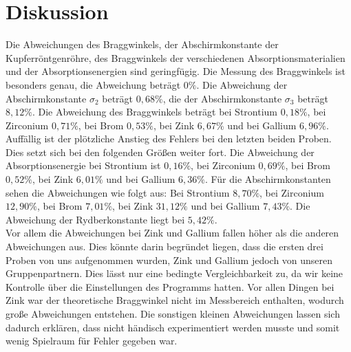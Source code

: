 \section{Diskussion}
\label{sec:Diskussion}
Die Abweichungen des Braggwinkels, der Abschirmkonstante der Kupferröntgenröhre, des Braggwinkels der verschiedenen Absorptionsmaterialien und der 
Absorptionsenergien sind geringfügig. Die Messung des Braggwinkels ist besonders genau, die Abweichung beträgt $0 \%$. Die Abweichung der Abschirmkonstante $\sigma_2$ 
beträgt $0,68 \%$, die der Abschirmkonstante $\sigma_3$ beträgt $8,12 \%$. 
Die Abweichung des Braggwinkels beträgt bei Strontium $0,18 \%$, bei Zirconium $0,71 \%$, bei Brom $0,53 \%$, bei Zink $6,67 \%$ und bei Gallium $6,96 \%$. 
Auffällig ist der plötzliche Anstieg des Fehlers bei den letzten beiden Proben. Dies setzt sich bei den folgenden Größen weiter fort. Die Abweichung der
Absorptionsenergie bei Strontium ist $0,16 \%$, bei Zirconium $0,69 \%$, bei Brom $0,52 \%$, bei Zink $6,01 \%$ und bei Gallium $6,36 \%$. Für die Abschirmkonstanten sehen
die Abweichungen wie folgt aus: Bei Strontium  $8,70 \%$, bei Zirconium $12,90 \%$, bei Brom $7,01 \%$, bei Zink $31,12 \%$ und bei Gallium $7,43 \%$.
Die Abweichung der Rydberkonstante liegt bei $5,42 \%$. \\ 
Vor allem die Abweichungen bei Zink und Gallium fallen höher als die anderen Abweichungen aus. Dies könnte darin begründet liegen, dass die ersten drei Proben von 
uns aufgenommen wurden, Zink und Gallium jedoch von unseren Gruppenpartnern. Dies lässt nur eine bedingte Vergleichbarkeit zu, da wir keine Kontrolle über die 
Einstellungen des Programms hatten. 
Vor allen Dingen bei Zink war der theoretische Braggwinkel nicht im Messbereich enthalten, wodurch große Abweichungen entstehen. Die sonstigen kleinen Abweichungen 
lassen sich dadurch erklären, dass nicht händisch experimentiert werden musste und somit wenig Spielraum für Fehler gegeben war. 